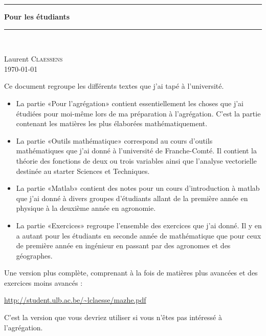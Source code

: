 
\thispagestyle{empty}
\begin{center}
  \begin{minipage}{15cm}
    \hrule\par
    \vspace{2mm}
    \begin{center}
    \Huge \bfseries  Pour les étudiants \par
    \end{center}
    \hrule\par
  \end{minipage}\\
\end{center}

\vspace{2cm}

\begin{center}
    Laurent \textsc{Claessens}\\
    \today
\end{center}

\vfill

\LogoEtLicence

\clearpage

\thispagestyle{empty}

Ce document regroupe les différents textes que j'ai tapé à l'université.
\begin{itemize}
    \item La partie «Pour l'agrégation» contient essentiellement les choses que j'ai étudiées pour moi-même lors de ma préparation à l'agrégation. C'est la partie contenant les matières les plus élaborées mathématiquement.
    \item La partie «Outils mathématique» correspond au cours d'outils mathématiques que j'ai donné à l'université de Franche-Comté. Il contient la théorie des fonctions de deux ou trois variables ainsi que l'analyse vectorielle destinée au starter Sciences et Techniques.
    \item La partie «Matlab» contient des notes pour un cours d'introduction à matlab que j'ai donné à divers groupes d'étudiants allant de la première année en physique à la deuxième année en agronomie.
    \item La partie «Exercices» regroupe l'ensemble des exercices que j'ai donné. Il y en a autant pour les étudiants en seconde année de mathématique que pour ceux de première année en ingénieur en passant par des agronomes et des géographes.
        
\end{itemize}

        Une version plus complète, comprenant à la fois de matières plus avancées et des exercices moins avancés : 
        \begin{center}
        \url{http://student.ulb.ac.be/~lclaesse/mazhe.pdf}
        \end{center}

        C'est la version que vous devriez utiliser si vous n'êtes pas intéressé à l'agrégation.



\clearpage
